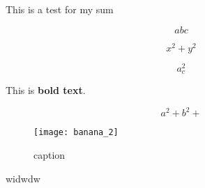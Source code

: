 This is a test for my sum 

\begin{equation}
    abc  
\end{equation}	


\begin{equation}
    x^2 + y^2 
\end{equation}


\[ a^{2}_{c}  \]

This is \textbf{bold text}.

\[ a^{2} + b^{2} + \]

\begin{figure}[H]
	\centering
	\texttt{[image: banana\_2]}
	\caption{caption}
	\label{fig:label}
\end{figure}

\begin{test}
   widwdw 
\end{test} 

